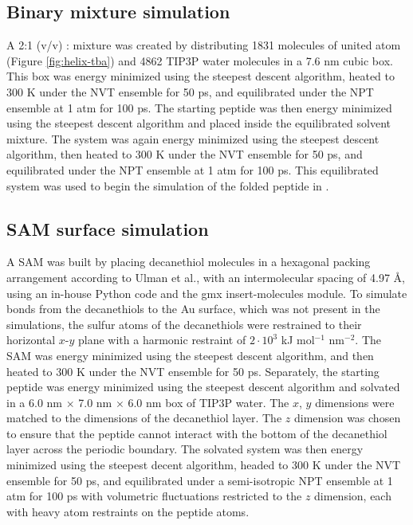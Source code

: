 \subsection{Binary mixture simulation}

A 2:1 (v/v) \tba{}: mixture was created by distributing 1831 molecules of united atom \tba{} (Figure \ref{fig:helix-tba}) and 4862 TIP3P water molecules in a 7.6 nm cubic box. 
This box was energy minimized using the steepest descent algorithm, heated to 300 K under the NVT ensemble for 50 ps, and equilibrated under the NPT ensemble at 1 atm for 100 ps. 
The starting peptide was then energy minimized using the steepest descent algorithm and placed inside the equilibrated solvent mixture. 
The system was again energy minimized using the steepest descent algorithm, then heated to 300 K under the NVT ensemble for 50 ps, and equilibrated under the NPT ensemble at 1 atm for 100 ps. 
This equilibrated system was used to begin the simulation of the folded peptide in \tbawat{}. 

\subsection{SAM surface simulation}

A SAM was built by placing decanethiol molecules in a hexagonal packing arrangement according to Ulman et al.\cite{Ulman1989}, with an intermolecular spacing of 4.97 \si{\angstrom}, using an in-house Python code and the gmx insert-molecules module. 
To simulate bonds from the decanethiols to the Au surface, which was not present in the simulations, the sulfur atoms of the decanethiols were restrained to their horizontal $x$-$y$ plane with a harmonic restraint of $2\cdot10^3$ kJ mol$^{-1}$ nm$^{-2}$. 
The SAM was energy minimized using the steepest descent algorithm, and then heated to 300 K under the NVT ensemble for 50 ps. 
Separately, the starting peptide was energy minimized using the steepest descent algorithm and solvated in a 6.0 nm $\times$ 7.0 nm $\times$ 6.0 nm box of TIP3P water. 
The $x$, $y$ dimensions were matched to the dimensions of the decanethiol layer. 
The $z$ dimension was chosen to ensure that the peptide cannot interact with the bottom of the decanethiol layer across the periodic boundary. 
The solvated system was then energy minimized using the steepest decent algorithm, headed to 300 K under the NVT ensemble for 50 ps, and equilibrated under a semi-isotropic NPT ensemble at 1 atm for 100 ps with volumetric fluctuations restricted to the $z$ dimension, each with heavy atom restraints on the peptide atoms. 

